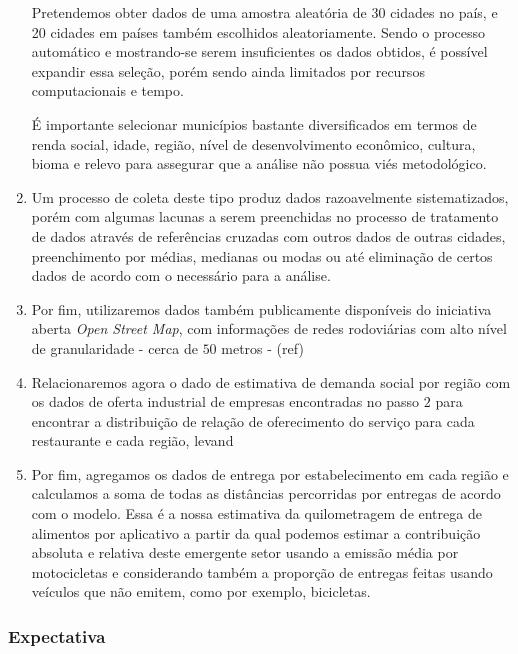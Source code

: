 \documentclass[14pt,a4paper]{article}
\begin{document}
\begin{enumerate}
		Pretendemos obter dados de uma amostra aleatória de 30 cidades no país, e 20 cidades em países também escolhidos aleatoriamente. Sendo o processo automático e mostrando-se serem insuficientes os dados obtidos, é possível expandir essa seleção, porém sendo ainda limitados por recursos computacionais e tempo.
		
		É importante selecionar municípios bastante diversificados em termos de renda social, idade, região, nível de desenvolvimento econômico, cultura, bioma e relevo para assegurar que a análise não possua viés metodológico.	
		
		\item Um processo de coleta deste tipo produz dados razoavelmente sistematizados, porém com algumas lacunas a serem preenchidas no processo de tratamento de dados através de referências cruzadas com outros dados de outras cidades, preenchimento por médias, medianas ou modas ou até eliminação de certos dados de acordo com o necessário para a análise.
		
		\item Por fim, utilizaremos dados também publicamente disponíveis do iniciativa aberta \textit{Open Street Map}, com informações de redes rodoviárias com alto nível de granularidade - cerca de $50$ metros - (ref)
		
		\item Relacionaremos agora o dado de estimativa de demanda social por região com os dados de oferta industrial de empresas encontradas no passo $2$ para encontrar a distribuição de relação de oferecimento do serviço para cada restaurante e cada região, levand
		
		\item Por fim, agregamos os dados de entrega por estabelecimento em cada região e calculamos  a soma de todas as distâncias percorridas por entregas de acordo com o modelo. Essa é a nossa estimativa da quilometragem de entrega de alimentos por aplicativo a partir da qual podemos estimar a contribuição absoluta e relativa deste emergente setor usando a emissão média por motocicletas e considerando também a proporção de entregas feitas usando veículos que não emitem, como por exemplo, bicicletas.  
		
		
	\end{enumerate}
	
	\subsubsection{Expectativa}
	
\end{document}

